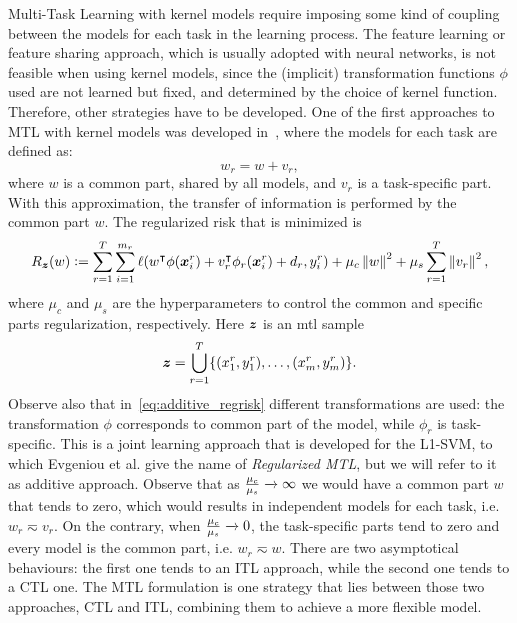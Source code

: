 Multi-Task Learning with kernel models require imposing some kind of coupling between the models for each task in the learning process. The feature learning or feature sharing approach, which is usually adopted with neural networks, is not feasible when using kernel models, since the (implicit) transformation functions $\phi$ used are not learned but fixed, and determined by the choice of kernel function. Therefore, other strategies have to be developed. 
One of the first approaches to MTL with kernel models was developed in~\cite{EvgeniouP04}, where the models for each task are defined as:
\begin{equation}
    \nonumber
    {w}_r = {w} + {v}_r,
\end{equation} 
where $w$ is a common part, shared by all models, and $v_r$ is a task-specific part. With this approximation, the transfer of information is performed by the common part ${w}$.
The regularized risk that is minimized is 
\begin{equation}
    \label{eq:additive_regrisk}
    \risk_{\bsample} ({w}) \defeq \sum_{r=1}^{\ntasks} \sum_{i=1}^{\npertask_r} \lossf({w}^\intercal {\phi(\fv{x}_i^r)} + {v}_r^\intercal {\phi_r(\fv{x}_i^r)} + d_r, y_i^r) + \mu_c \norm{{w}}^2 + \mu_s \sum_{r=1}^\ntasks \norm{{v}_r}^2,
\end{equation}
where $\mu_c$ and $\mu_s$ are the hyperparameters to control the common and specific parts regularization, respectively. Here $\bm{z}$ is an \acrshort{mtl} sample $$\bm{z} = \bigcup_{r=1}^T \{(x_1^r, y_1^r), \ldots, (x_{m}^r, y_{m}^r)\}.$$
Observe also that in~\eqref{eq:additive_regrisk} different transformations are used: the transformation $\phi$ corresponds to common part of the model, while $\phi_r$ is task-specific.
%
This is a joint learning approach that is developed for the L1-SVM, to which Evgeniou et al. give the name of \emph{Regularized MTL}, but we will refer to it as {additive} approach.
%
Observe that as $\frac{\mu_c}{\mu_s} \xrightarrow[]{} \infty $ we would have a common part ${w}$ that tends to zero, which would results in independent models for each task, i.e. ${w}_r \eqsim {v}_r$. On the contrary, when $\frac{\mu_c}{\mu_s} \xrightarrow[]{} 0 $, the task-specific parts tend to zero and every model is the common part, i.e. ${w}_r \eqsim {w}$.
There are two asymptotical behaviours: the first one tends to an ITL approach, while the second one tends to a CTL one. The MTL formulation is one strategy that lies between those two approaches, CTL and ITL, combining them to achieve a more flexible model.

